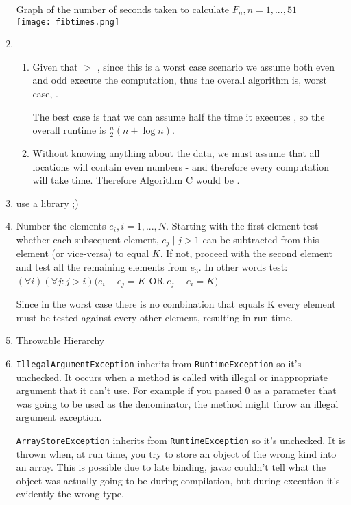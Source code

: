 \documentclass[12pt]{chmullighw}
\begin{document}
\begin{enumerate}
Graph of the number of seconds taken to calculate $F_n, n=1,...,51$ \\
\texttt{[image: fibtimes.png]}


\item
    \begin{enumerate}
    \item  Given that  $>$ , since this is a worst case scenario
we assume both even and odd execute the  computation, thus the overall
algorithm is, worst case, .

    The best case is that we can assume half the time it executes ,
    so the overall runtime is $\frac{n}{2}(n + \log n)$.
    \item Without knowing anything about the data, we must assume that all locations
    will contain even numbers - and therefore every computation will take  time. Therefore
    Algorithm C would be .
    \end{enumerate}

\item use a library ;)

\item Number the elements $e_i, i=1,...,N$. Starting with the first element test
whether each subsequent element, $e_j \mid j > 1$ can be subtracted from this element (or
vice-versa) to equal $K$. If not, proceed with the second element and test all
the remaining elements from $e_3$. In other words test:\\
$(\forall i)(\forall j : j > i)(e_i - e_j = K$ OR $e_j - e_i = K)$

Since in the worst case there is no combination that equals K every element must
be tested against every other element, resulting in  run time.

\item Throwable Hierarchy



\item 
\texttt{IllegalArgumentException} inherits from \texttt{RuntimeException} so it's unchecked. It occurs when a method is called with illegal or inappropriate argument that it can't use. For example if you passed 0 as a parameter that was going to be used as the denominator, the method might throw an illegal argument exception.

\texttt{ArrayStoreException} inherits from \texttt{RuntimeException} so it's unchecked. It is thrown when, at run time, you try to store an object of the wrong kind into an array. This is possible due to late binding, javac couldn't tell what the object was actually going to be during compilation, but during execution it's evidently the wrong type.


\end{enumerate}
\end{document}
